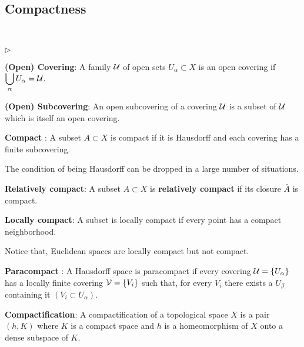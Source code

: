 \subsection{Compactness}
\begin{definition}
\

\begin{list}{$\triangleright$}{}
\item {\bf (Open) Covering}: A family $\mathcal{U}$ of open sets $U _{\alpha}\subset X$ is an open covering  if $\displaystyle \bigcup_{\alpha} U_{\alpha}=\mathcal{U}$.

\item {\bf (Open) Subcovering}: An open subcovering of a covering $\mathcal{U}$ is a subset of $\mathcal{U}$ which is itself an open covering.

\item {\bf Compact }: A subset $A \subset X$ is compact if it is Hausdorff
and each covering has a finite subcovering.

The condition of being Hausdorff  can be dropped  in a large number of situations.
\item {\bf Relatively compact}: A subset $A \subset X$ is {\bf relatively compact} if its closure $\bar A$ is compact.

\item {\bf Locally compact}:  A subset is locally compact if every point has a compact neighborhood.

Notice that, Euclidean spaces are locally compact but not compact.

\item {\bf Paracompact }:  A Hausdorff space is paracompact if every covering $\mathcal{U}=\{ U _{\alpha}\}$ has a locally finite covering $\mathcal{V}=\{V _i\}$ such that, for every $V_i$ there exists a $U _{\beta}$ containing it $(V_i\subset U _{\alpha})$.

\item {\bf Compactification}: A compactification of a topological space $X$ is a pair $(h,K)$ where $K$ is a compact space and $h$ is a homeomorphism of $X$ onto a dense subspace of $K$.
\end{list}
\end{definition}

